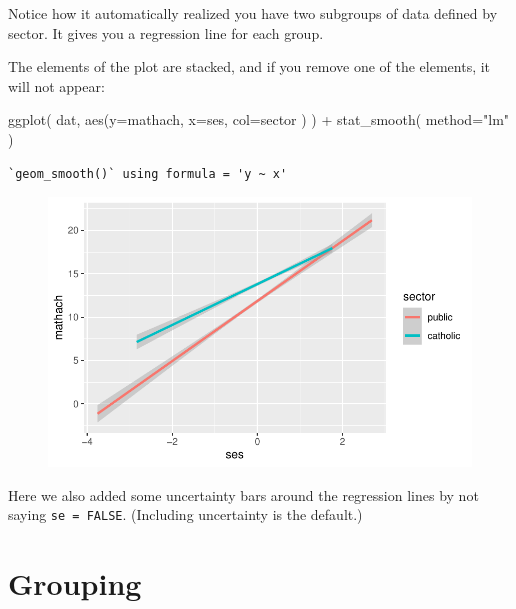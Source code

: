 \documentclass[
  letterpaper,
  DIV=11,
  numbers=noendperiod]{scrreprt}
\newenvironment{Shaded}{\begin{snugshade}}{\end{snugshade}}
\newcommand{\AttributeTok}[1]{\textcolor[rgb]{0.49,0.56,0.16}{#1}}
\newcommand{\FunctionTok}[1]{\textcolor[rgb]{0.02,0.16,0.49}{#1}}
\newcommand{\NormalTok}[1]{\textcolor[rgb]{0.00,0.44,0.13}{#1}}
\newcommand{\SpecialCharTok}[1]{\textcolor[rgb]{0.25,0.44,0.63}{#1}}
\newcommand{\StringTok}[1]{\textcolor[rgb]{0.25,0.44,0.63}{#1}}
\begin{document}
Notice how it automatically realized you have two subgroups of data
defined by sector. It gives you a regression line for each group.

The elements of the plot are stacked, and if you remove one of the
elements, it will not appear:

\begin{Shaded}
\begin{Highlighting}[]
\FunctionTok{ggplot}\NormalTok{( dat, }\FunctionTok{aes}\NormalTok{(}\AttributeTok{y=}\NormalTok{mathach, }\AttributeTok{x=}\NormalTok{ses, }\AttributeTok{col=}\NormalTok{sector ) ) }\SpecialCharTok{+} 
  \FunctionTok{stat\_smooth}\NormalTok{( }\AttributeTok{method=}\StringTok{"lm"}\NormalTok{ )}
\end{Highlighting}
\end{Shaded}

\begin{verbatim}
`geom_smooth()` using formula = 'y ~ x'
\end{verbatim}

\begin{figure}[H]

{\centering \includegraphics{intro_ggplot_files/figure-pdf/unnamed-chunk-5-1.pdf}

}

\end{figure}

Here we also added some uncertainty bars around the regression lines by
not saying \texttt{se\ =\ FALSE}. (Including uncertainty is the
default.)

\hypertarget{grouping}{%
\section{Grouping}\label{grouping}}
\end{document}

